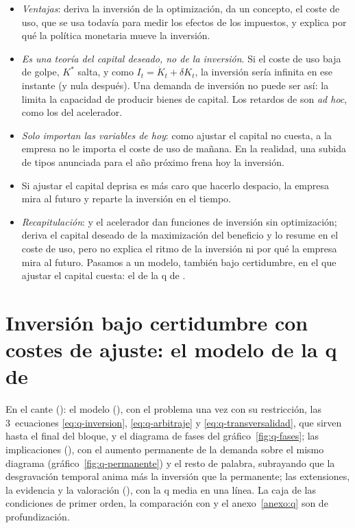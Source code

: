\documentclass[11pt]{article}
\begin{document}
\begin{itemize}
\item \emph{Ventajas}: deriva la inversión de la optimización, da un concepto, el coste de uso, que se usa todavía para medir los efectos de los impuestos, y explica por qué la política monetaria mueve la inversión.
\item \emph{Es una teoría del capital deseado, no de la inversión}\nocite{Haavelmo1960Study}. Si el coste de uso baja de golpe, $K^*$ salta, y como $I_t=\dot K_t+\delta K_t$, la inversión sería infinita en ese instante (y nula después). Una demanda de inversión no puede ser así: la limita la capacidad de producir bienes de capital. Los retardos de  son \emph{ad hoc}, como los del acelerador.
\item \emph{Solo importan las variables de hoy}: como ajustar el capital no cuesta, a la empresa no le importa el coste de uso de mañana. En la realidad, una subida de tipos anunciada para el año próximo frena hoy la inversión.
\item Si ajustar el capital deprisa es más caro que hacerlo despacio, la empresa mira al futuro y reparte la inversión en el tiempo.
\end{itemize}

\begin{itemize}
\item \emph{Recapitulación}:  y el acelerador dan funciones de inversión sin optimización;  deriva el capital deseado de la maximización del beneficio y lo resume en el coste de uso, pero no explica el ritmo de la inversión ni por qué la empresa mira al futuro. Pasamos a un modelo, también bajo certidumbre, en el que ajustar el capital cuesta: el de la q de .
\end{itemize}


\section{Inversión bajo certidumbre con costes de ajuste:\cortetitulo{} el modelo de la q de }\label{sec:q}

\begin{notaopositor}
En el cante (): el modelo (), con el problema una vez con su restricción, las 3~ecuaciones \eqref{eq:q-inversion}, \eqref{eq:q-arbitraje} y \eqref{eq:q-transversalidad}, que sirven hasta el final del bloque, y el diagrama de fases del gráfico~\ref{fig:q-fases}; las implicaciones (), con el aumento permanente de la demanda sobre el mismo diagrama (gráfico~\ref{fig:q-permanente}) y el resto de palabra, subrayando que la desgravación temporal anima más la inversión que la permanente; las extensiones, la evidencia y la valoración (), con la q media en una línea. La caja de las condiciones de primer orden, la comparación con  y el anexo~\ref{anexo:q} son de profundización.
\end{notaopositor}
\end{document}
